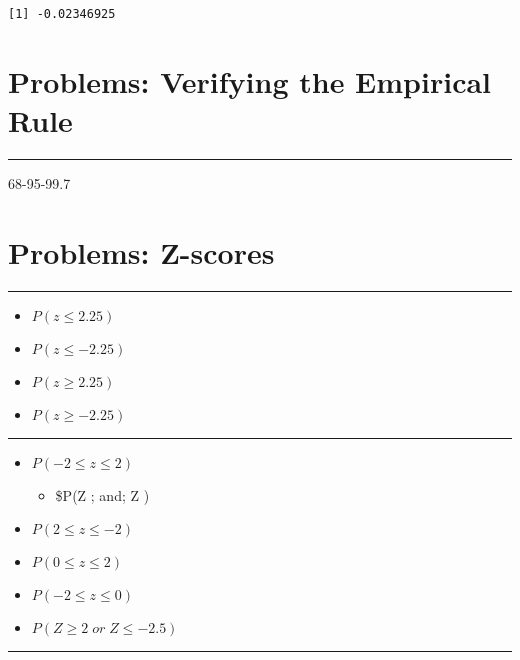 \documentclass[
  letterpaper,
  DIV=11,
  numbers=noendperiod]{scrreprt}
\providecommand{\tightlist}{%
  \setlength{\itemsep}{0pt}\setlength{\parskip}{0pt}}\usepackage{longtable,booktabs,array}
\begin{document}
\begin{verbatim}
[1] -0.02346925
\end{verbatim}

\hypertarget{problems-verifying-the-empirical-rule}{%
\section{Problems: Verifying the Empirical
Rule}\label{problems-verifying-the-empirical-rule}}

\begin{center}\rule{0.5\linewidth}{0.5pt}\end{center}

68-95-99.7

\hypertarget{problems-z-scores}{%
\section{Problems: Z-scores}\label{problems-z-scores}}

\begin{center}\rule{0.5\linewidth}{0.5pt}\end{center}

\begin{itemize}
\tightlist
\item
  \(P(z \le 2.25)\)
\item
  \(P(z \le -2.25)\)
\item
  \(P(z \ge 2.25)\)
\item
  \(P(z \ge -2.25)\)
\end{itemize}

\begin{center}\rule{0.5\linewidth}{0.5pt}\end{center}

\begin{itemize}
\tightlist
\item
  \(P(-2 \le z \le 2)\)

  \begin{itemize}
  \tightlist
  \item
    \$P(Z ; and; Z )
  \end{itemize}
\item
  \(P(2 \le z \le -2)\)
\item
  \(P(0 \le z \le 2)\)
\item
  \(P(-2 \le z \le 0)\)
\item
  \(P(Z \ge 2\; or\; Z \le -2.5)\)
\end{itemize}

\begin{center}\rule{0.5\linewidth}{0.5pt}\end{center}
\end{document}
